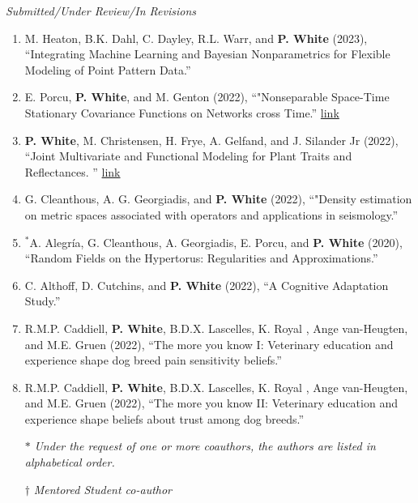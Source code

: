 \documentclass[11pt]{article}
\begin{document}
\emph{Submitted/Under Review/In Revisions}

\begin{enumerate}[label=$\bullet$]


\item M. Heaton, B.K. Dahl, C. Dayley, R.L. Warr, and \textbf{P. White} (2023), ``Integrating Machine Learning and Bayesian Nonparametrics for Flexible Modeling of Point Pattern Data.''


\item E. Porcu, \textbf{P. White}, and M. Genton (2022), ``"Nonseparable Space-Time Stationary Covariance Functions on Networks cross Time.'' \href{https://arxiv.org/abs/2208.03359}{link}

\item \textbf{P. White}, M. Christensen, H. Frye, A. Gelfand, and J. Silander Jr (2022), ``Joint Multivariate and Functional Modeling for Plant Traits and Reflectances.
''  \href{https://arxiv.org/abs/2210.00409}{link}

\item G. Cleanthous, A. G. Georgiadis, and \textbf{P. White} (2022), ``"Density estimation on metric spaces associated with operators and applications in seismology.''


\item $^*$A. Alegr\'ia, G. Cleanthous, A. Georgiadis, E. Porcu, and \textbf{P. White} (2020), ``Random Fields on the Hypertorus: Regularities and Approximations.'' 

\item C. Althoff, D. Cutchins, and \textbf{P. White} (2022), ``A Cognitive Adaptation Study.'' 

\item  R.M.P. Caddiell, \textbf{P. White}, B.D.X. Lascelles, K. Royal , Ange van-Heugten, and M.E. Gruen (2022), ``The more you know I: Veterinary education and experience shape dog breed pain sensitivity beliefs.''

\item  R.M.P. Caddiell, \textbf{P. White}, B.D.X. Lascelles, K. Royal , Ange van-Heugten, and M.E. Gruen (2022), ``The more you know II: Veterinary education and experience shape beliefs about trust among dog breeds.''
\setlength\itemsep{-1em} \\
\item[$*$] \textit{Under the request of one or more coauthors, the authors are listed in alphabetical order.}\\
\item[$\dagger$] \textit{Mentored Student co-author}
\end{enumerate}
\end{document}
